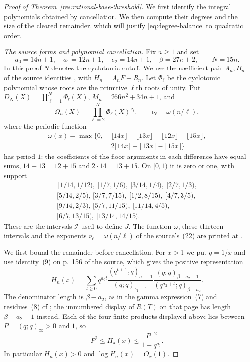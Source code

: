 \documentclass[11pt]{article}
\begin{document}
\begin{proof}[Proof of Theorem~\ref{res:rational-base-threshold}]
We first identify the integral polynomials obtained by cancellation.
We then compute their degrees and the size of the cleared remainder,
which will justify \eqref{eq:degree-balance} to quadratic order.

\emph{The source forms and polynomial cancellation.}
Fix $n\ge1$ and set
\[
 a_0=14n+1,\quad a_1=12n+1,\quad a_2=14n+1,\quad\beta=27n+2,
 \qquad N=15n.
\]
In this proof $N$ denotes the cyclotomic cutoff. We use the
coefficient pair $A_n,B_n$ of the source identities
\cite[(8)--(11), pp.~156--157]{zudilin2004}, with $H_n=A_nF-B_n$.
Let $\Phi_\ell$ be the cyclotomic polynomial whose roots are the primitive
$\ell$th roots of unity. Put $D_N(X)=\prod_{\ell=1}^{N}\Phi_\ell(X)$,
$M_n=266n^2+34n+1$, and
\[
 \Omega_n(X)=\prod_{\ell=2}^{N}\Phi_\ell(X)^{\nu_\ell},
 \qquad \nu_\ell=\omega(n/\ell),
\]
where the periodic function
\[
\begin{split}
\omega(x)=\max\{0,&\ \lfloor14x\rfloor+\lfloor13x\rfloor
                  -\lfloor12x\rfloor-\lfloor15x\rfloor,\\
                &\ 2\lfloor14x\rfloor-\lfloor13x\rfloor
                  -\lfloor15x\rfloor\}
\end{split}
\]
has period $1$: the coefficients of the floor arguments in each
difference have equal sums, $14+13=12+15$ and $2\cdot14=13+15$.
On $[0,1)$ it is zero or one, with support
\[
\begin{gathered}
\,[1/14,1/12),\ [1/7,1/6),\ [3/14,1/4),\ [2/7,1/3),\\
[5/14,2/5),\ [3/7,7/15),\ [1/2,8/15),\ [4/7,3/5),\\
[9/14,2/3),\ [5/7,11/15),\ [11/14,4/5),\\
[6/7,13/15),\ [13/14,14/15).
\end{gathered}
\]
These are the intervals $\mathcal I$ used to define $J$.
The function $\omega$, these thirteen intervals and the exponents
$\nu_\ell=\omega(n/\ell)$ of the source's~(22) are printed at
\cite[pp.~161--162]{zudilin2004}.


We first bound the remainder before cancellation. For $x>1$ we put
$q=1/x$ and use identity~(9) on p.~156 of the source, which gives the
positive representation
\[
 H_n(x)=\sum_{t\ge0}q^{a_0t}
 \frac{(q^{t+1};q)_{a_1-1}}{(q;q)_{a_1-1}}
 \frac{(q;q)_{\beta-a_2-1}}{(q^{a_2+t};q)_{\beta-a_2}}.
\]
The denominator length is $\beta-a_2$, as in the gamma expression~(7)
and residues~(8) of \cite[p.~156]{zudilin2004}; the unnumbered display
of $R(T)$ on that page has length $\beta-a_2-1$ instead.
Each of the four finite products displayed above lies between
$P=(q;q)_\infty>0$ and $1$, so
\[
 P^2\le H_n(x)\le\frac{P^{-2}}{1-q^{a_0}}.
\]
In particular $H_n(x)>0$ and $\log H_n(x)=O_x(1)$.


\end{proof}
\end{document}
